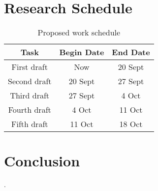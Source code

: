 \documentclass[11pt]{article}
\begin{document}
\vspace*{-.1in}
\section{Research Schedule}
\label{sec:schedule}
\vspace*{-.1in}

\begin{table}[htbp]
\centering
\begin{tabular}{|c||c|c|}
\hline
\bf Task & \bf Begin Date & \bf End Date\\\hline\hline
First draft & Now & 20 Sept\\\hline
Second draft & 20 Sept & 27 Sept\\\hline
Third draft & 27 Sept & 4 Oct\\\hline
Fourth draft & 4 Oct & 11 Oct\\\hline
Fifth draft & 11 Oct & 18 Oct\\\hline
\end{tabular}
\caption{Proposed work schedule}
\label{intro-tab1}
\end{table}

\vspace*{-.1in}
\section{Conclusion}
\label{sec:conclusion}
\vspace*{-.1in}


 \cite{jia2011analysis}.



\end{document}
